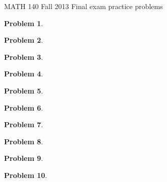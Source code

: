 \documentclass{article}[12pt]
\newtheorem{problem}{Problem}
\begin{document}
\begin{center}
MATH 140 Fall 2013 Final exam practice problems
\end{center}


\begin{problem}

\end{problem}

\begin{problem}

\end{problem}

\begin{problem}

\end{problem}

\begin{problem}

\end{problem}

\begin{problem}


\end{problem}

\begin{problem}

\end{problem}

\begin{problem}

\end{problem}

\begin{problem}

\end{problem}

\begin{problem}

\end{problem}

\begin{problem}

\end{problem}
\end{document}
